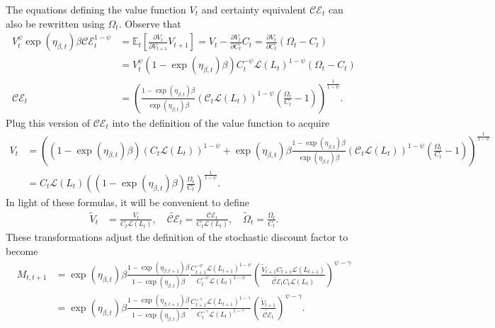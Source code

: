\documentclass[12 pt, oneside]{article}
\theoremstyle{definition}
\theoremstyle{definition}
\theoremstyle{definition}
\newcommand{\E}{\mathbb{E}}
\newcommand{\calC}{\mathcal{C}}
\newcommand{\calE}{\mathcal{E}}
\newcommand{\calL}{\mathcal{L}}
\begin{document}
The equations defining the value function $V_t$ and certainty equivalent $\calC\calE_t$ can also be rewritten using $\Omega_t$. Observe that
\begin{align*}
  V_t^\psi \exp(\eta_{\beta, t})\beta \calC\calE_t^{1 - \psi} & = \E_t\left[\frac{\partial V_t}{\partial V_{t + 1}}V_{t + 1}\right] = V_t - \frac{\partial V_t}{\partial C_t}C_t = \frac{\partial V_t}{\partial C_t}(\Omega_t - C_t)\\
                                                              & = V_t^\psi (1 - \exp(\eta_{\beta, t})\beta)C_t^{ - \psi}\calL(L_t)^{1 - \psi}(\Omega_t - C_t)\\
  \calC\calE_t & = \left(\frac{1 - \exp(\eta_{\beta, t})\beta}{\exp(\eta_{\beta, t})\beta}(\calC_t\calL(L_t))^{1 - \psi}\left(\frac{\Omega_t}{C_t} - 1\right)\right)^{\frac{1}{1 - \psi}}.
\end{align*}
Plug this version of $\calC\calE_t$ into the definition of the value function to acquire
\begin{align*}
  V_t & = \left((1 - \exp(\eta_{\beta, t})\beta)(C_t\calL(L_t))^{1 - \psi} + \exp(\eta_{\beta, t})\beta \frac{1 - \exp(\eta_{\beta, t})\beta}{\exp(\eta_{\beta, t})\beta}(\calC_t\calL(L_t))^{1 - \psi}\left(\frac{\Omega_t}{C_t} - 1\right)\right)^{\frac{1}{1 - \psi}}\\
      & = C_t \calL(L_t) \left((1 - \exp(\eta_{\beta, t})\beta)\frac{\Omega_t}{C_t}\right)^{\frac{1}{1 - \psi}}.
\end{align*}
In light of these formulas, it will be convenient to define
\begin{align}
  \tilde{V}_t & = \frac{V_t}{C_t\calL(L_t)}, \quad \tilde{\calC\calE}_t = \frac{\calC\calE_t}{C_t\calL(L_t)}, \quad \tilde{\Omega}_t = \frac{\Omega_t}{C_t}.
\end{align}
These transformations adjust the definition of the stochastic discount factor to become
\begin{align*}
  M_{t, t + 1} & = \exp(\eta_{\beta, t})\beta\frac{1 - \exp(\eta_{\beta, t + 1})\beta}{1 - \exp(\eta_{\beta, t})\beta} \frac{C_{t + 1}^{ - \psi} \calL(L_{t + 1})^{1 - \psi}}{C_t^{- \psi} \calL(L_t)^{1 - \psi}}\left(\frac{\tilde{V}_{t + 1} C_{t + 1}\calL(L_{t + 1})}{\tilde{\calC\calE}_t C_t\calL(L_t)}\right)^{ \psi - \gamma}\\
               & = \exp(\eta_{\beta, t})\beta\frac{1 - \exp(\eta_{\beta, t + 1})\beta}{1 - \exp(\eta_{\beta, t})\beta} \frac{C_{t + 1}^{- \gamma } \calL(L_{t + 1})^{1 - \gamma}}{C_t^{-\gamma} \calL(L_t)^{1 - \gamma}}\left(\frac{\tilde{V}_{t + 1}}{\tilde{\calC\calE}_t}\right)^{ \psi - \gamma}.
\end{align*}
\end{document}
